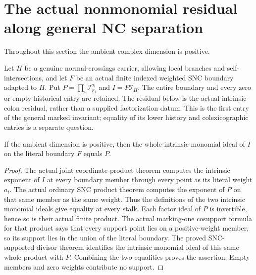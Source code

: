 \section{The actual nonmonomial residual along general NC separation}
\label{sec:hironaka-normal-crossings-actual-residual}

Throughout this section the ambient complex dimension is positive.

Let $H$ be a genuine normal-crossings carrier, allowing local branches and
self-intersections, and let $F$ be an actual finite indexed weighted SNC
boundary adapted to $H$. Put $P=\prod_i\mathcal I_{F_i}^{a_i}$ and
$I=P\mathcal I_H$. The entire boundary and every zero or empty historical
entry are retained. The residual below is the actual intrinsic colon
residual, rather than a supplied factorization datum. This is the first
entry of the general marked invariant; equality of its lower history and
colexicographic entries is a separate question.

\begin{lemma}
\label{hir:general-nc-actual-joint-monomial-factor}
\leanok
If the ambient dimension is positive, then the whole intrinsic monomial
ideal of $I$ on the literal boundary $F$ equals $P$.
\end{lemma}
\begin{proof}
The actual joint coordinate-product theorem computes the intrinsic
exponent of $I$ at every boundary member through every point as its
literal weight $a_i$. The actual ordinary SNC product theorem computes
the exponent of $P$ on that same member as the same weight. Thus the
definitions of the two intrinsic monomial ideals give equality at every
stalk. Each factor ideal of $P$ is invertible, hence so is their actual
finite product. The actual marking-one cosupport formula for that
product says that every support point lies on a positive-weight member,
so its support lies in the union of the literal boundary. The proved
SNC-supported divisor theorem identifies the intrinsic monomial ideal
of this same whole product with $P$. Combining the two equalities proves
the assertion. Empty members and zero weights contribute no support.
\end{proof}

